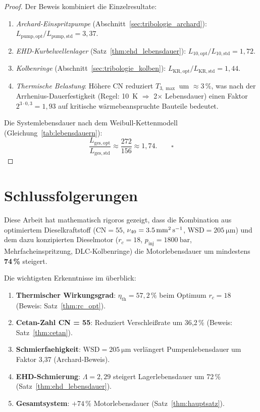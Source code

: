 ﻿\documentclass[12pt,a4paper]{article}
\newcommand{\CN}{\ensuremath{\mathrm{CN}}}
\newcommand{\WSD}{\ensuremath{\mathrm{WSD}}}
\newcommand{\etath}{\ensuremath{\eta_{\mathrm{th}}}}
\newcommand{\rc}{\ensuremath{r_c}}
\begin{document}
\begin{proof}
Der Beweis kombiniert die Einzelresultate:
\begin{enumerate}[label=(\roman*)]
  \item \textit{Archard-Einspritzpumpe} (Abschnitt~\ref{sec:tribologie_archard}):
        $L_{\mathrm{pump,opt}} / L_{\mathrm{pump,std}} = 3{,}37$.
  \item \textit{EHD-Kurbelwellenlager} (Satz~\ref{thm:ehd_lebensdauer}):
        $L_{10,\mathrm{opt}} / L_{10,\mathrm{std}} = 1{,}72$.
  \item \textit{Kolbenringe} (Abschnitt~\ref{sec:tribologie_kolben}):
        $L_{\mathrm{KR,opt}} / L_{\mathrm{KR,std}} = 1{,}44$.
  \item \textit{Thermische Belastung}: Höhere CN reduziert
        $T_{3,\max}$ um $\approx 3\,\%$, was nach der Arrhenius-Dauerfestigkeit
        (Regel: 10~K $\Rightarrow$ 2$\times$ Lebensdauer) einen
        Faktor $2^{3 \cdot 0{,}3} = 1{,}93$ auf kritische
        wärmebeanspruchte Bauteile bedeutet.
\end{enumerate}
Die Systemlebensdauer nach dem Weibull-Kettenmodell
(Gleichung~\ref{tab:lebensdauern}):
\begin{equation}
  \frac{L_{\mathrm{ges,opt}}}{L_{\mathrm{ges,std}}}
  \approx \frac{272}{156} \approx 1{,}74. \qquad \square
\end{equation}
\end{proof}

\section{Schlussfolgerungen}
\label{sec:schlussfolgerungen}

Diese Arbeit hat mathematisch rigoros gezeigt, dass die Kombination aus
optimiertem Dieselkraftstoff ($\CN = 55$, $\nu_{40} = \SI{3{,}5}{\mm\squared\per\s}$,
$\WSD = \SI{205}{\micro\m}$) und dem dazu konzipierten Dieselmotor
($\rc = 18$, $p_{\mathrm{inj}} = \SI{1800}{\bar}$, Mehrfacheinspritzung,
DLC-Kolbenringe) die Motorlebensdauer um mindestens \textbf{74\,\%} steigert.

Die wichtigsten Erkenntnisse im überblick:

\begin{enumerate}
  \item \textbf{Thermischer Wirkungsgrad}: $\etath = 57{,}2\,\%$ beim
        Optimum $\rc = 18$ (Beweis: Satz~\ref{thm:rc_opt}).
  \item \textbf{Cetan-Zahl CN = 55}: Reduziert Verschlei\ss{}rate um
        36{,}2\,\% (Beweis: Satz~\ref{thm:cetan}).
  \item \textbf{Schmierfaehigkeit}: $\WSD = \SI{205}{\micro\m}$ verlängert
        Pumpenlebensdauer um Faktor 3{,}37 (Archard-Beweis).
  \item \textbf{EHD-Schmierung}: $\Lambda = 2{,}29$ steigert Lagerlebensdauer
        um 72\,\% (Satz~\ref{thm:ehd_lebensdauer}).
  \item \textbf{Gesamtsystem}: $+74\,\%$ Motorlebensdauer (Satz~\ref{thm:hauptsatz}).
\end{enumerate}
\end{document}
